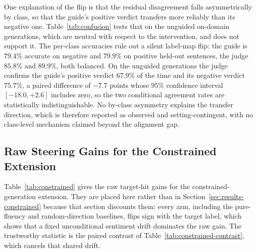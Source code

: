 One explanation of the flip is that the residual disagreement falls asymmetrically by class,
so that the guide's positive verdict transfers more reliably than its negative one.
Table~\ref{tab:confusion} tests that on the unguided on-domain generations, which are neutral
with respect to the intervention, and does not support it. The per-class accuracies rule out a
silent label-map flip: the guide is $79.4\%$ accurate on negative and $79.9\%$ on positive
held-out sentences, the judge $85.8\%$ and $89.9\%$, both balanced.
On the unguided generations the judge confirms the guide's positive verdict $67.9\%$ of the
time and its negative verdict $75.7\%$, a paired difference of $-7.7$ points whose $95\%$
confidence interval $[-18.0, +2.6]$ includes zero, so the two conditional agreement rates are
statistically indistinguishable. No by-class asymmetry explains the transfer direction, which
is therefore reported as observed and setting-contingent, with no class-level mechanism
claimed beyond the alignment gap.



\subsection{Raw Steering Gains for the Constrained Extension}
\label{app:constrained-raw}

Table~\ref{tab:constrained} gives the raw target-hit gains for the constrained-generation extension. They are placed here rather than in Section~\ref{sec:results-constrained} because that section discounts them: every arm, including the pure-fluency and random-direction baselines, flips sign with the target label, which shows that a fixed unconditional sentiment drift dominates the raw gain. The trustworthy statistic is the paired contrast of Table~\ref{tab:constrained-contrast}, which cancels that shared drift.

